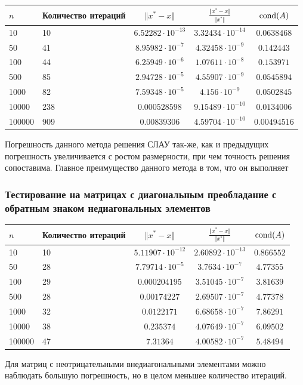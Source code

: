 \documentclass[english]{article}
\begin{document}
\begin{center}
  \begin{longtable}{l|l|c|c|c}
    \(n\) & Количество итераций & \(\Vert x^* - x \Vert\) & \(\frac{\Vert x^* - x \Vert}{\Vert x^* \Vert}\) & \(\mathop{\rm cond}(A) \)\\
    \hline
    10 & 10 & \(6.52282\cdot 10^{-13}\) & \(3.32434\cdot 10^{-14}\) & \(0.0638468\) \\
    50 & 41 & \(8.95982\cdot 10^{-7}\) & \(4.32458\cdot 10^{-9}\) & \(0.142443\) \\
    100 & 44 & \(6.25949\cdot 10^{-6}\) & \(1.07611\cdot 10^{-8}\) & \(0.153971\) \\
    500 & 85 & \(2.94728\cdot 10^{-5}\) & \(4.55907\cdot 10^{-9}\) & \(0.0545894\) \\
    1000 & 82 & \(7.59348\cdot 10^{-5}\) & \(4.156\cdot 10^{-9}\) & \(0.0502845\) \\
    10000 & 238 & \(0.000528598\) & \(9.15489\cdot 10^{-10}\) & \(0.0134006\) \\
    100000 & 909 & \(0.00839306\) & \(4.59704\cdot 10^{-10}\) & \(0.00494516\)
  \end{longtable}
\end{center}
Погрешность данного метода решения СЛАУ так-же, как и предыдущих
погрешность увеличивается с ростом размерности, при чем точность
решения сопоставима. Главное преимущество данного метода в том, что он
выполняет
\subsubsection{Тестирование на матрицах с диагональным преобладание с обратным знаком недиагональных элементов}
\begin{center}
  \begin{longtable}{l|l|c|c|c}
    \(n\) & Количество итераций & \(\Vert x^* - x \Vert\) & \(\frac{\Vert x^* - x \Vert}{\Vert x^* \Vert}\) & \(\mathop{\rm cond}(A) \)\\
    \hline
    10 & 10 & \(5.11907\cdot 10^{-12}\) & \(2.60892\cdot 10^{-13}\) & \(0.866552\) \\
    50 & 28 & \(7.79714\cdot 10^{-5}\) & \(3.7634\cdot 10^{-7}\) & \(4.77355\) \\
    100 & 29 & \(0.000204195\) & \(3.51045\cdot 10^{-7}\) & \(3.81639\) \\
    500 & 28 & \(0.00174227\) & \(2.69507\cdot 10^{-7}\) & \(4.77378\) \\
    1000 & 32 & \(0.0122171\) & \(6.68658\cdot 10^{-7}\) & \(7.86291\) \\
    10000 & 38 & \(0.235374\) & \(4.07649\cdot 10^{-7}\) & \(6.09502\) \\
    100000 & 47 & \(7.31364\) & \(4.00582\cdot 10^{-7}\) & \(5.48494\)
  \end{longtable}
\end{center}
Для матриц с неотрицательными внедиагональными элементами можно наблюдать большую погрешность, но в целом меньшее количество итераций.
\end{document}
